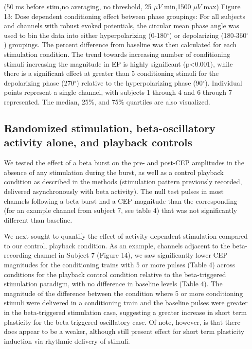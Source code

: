 (50 ms before stim,no averaging, no threshold, 25 $\mu V $ min,1500 $ \mu V $ max)
Figure 13: Dose dependent conditioning effect between phase groupings: For all subjects and channels with robust evoked potentials, the circular mean phase angle was used to bin the data into either hyperpolarizing (0-180$^\circ$) or depolarizing (180-360$^\circ$) groupings. The percent difference from baseline was then calculated for each stimulation condition. The trend towards increasing number of conditioning stimuli increasing the magnitude in EP is highly significant (p<0.001), while there is a significant effect at greater than 5 conditioning stimuli for the depolarizing phase (270$^\circ$) relative to the hyperpolarizing phase (90$^\circ$). Individual points represent a single channel, with subjects 1 through 4 and 6 through 7 represented. The median, 25\%, and 75\% quartiles are also visualized.

\subsection{Randomized stimulation, beta-oscillatory activity alone, and playback controls}

We tested the effect of a beta burst on the pre- and post-CEP amplitudes in the absence of any stimulation during the burst, as well as a control playback condition as described in the methods (stimulation pattern previously recorded, delivered asynchronously with beta activity). The null test pulses in most channels following a beta burst had a CEP magnitude than the corresponding (for an example channel from subject 7, see table 4) that was not significantly different than baseline. 

We next sought to quantify the effect of activity dependent stimulation compared to our control, playback condition. As an example, channels adjacent to the beta-recording channel in Subject 7 (Figure 14), we saw significantly lower CEP magnitudes for the conditioning trains with 5 or more pulses (Table 4) across conditions for the playback control condition relative to the beta-triggered stimulation paradigm, with no difference in baseline levels (Table 4). The magnitude of the difference between the condition where 5 or more conditioning stimuli were delivered in a conditioning train and the baseline pulses were greater in the beta-triggered stimulation case, suggesting a greater increase in short term plasticity for the beta-triggered oscillatory case. Of note, however, is that there does appear to be a weaker, although still present effect for short term plasticity induction via rhythmic delivery of stimuli. 


